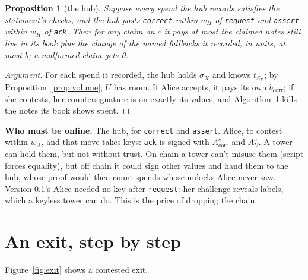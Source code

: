 \documentclass[11pt]{article}
\theoremstyle{plain}
\newtheorem{proposition}{Proposition}
\theoremstyle{definition}
\newcommand{\bcorr}{b_{\mathrm{corr}}}
\newcommand{\tx}[1]{\texttt{#1}}
\newcommand{\Acorr}{A_{\mathrm{corr}}^{c}}
\newcommand{\AU}{A_{U}^{c}}
\begin{document}
\begin{proposition}[the hub]\label{prop:hub}
Suppose every spend the hub records satisfies the statement's checks,
and the hub posts \tx{correct} within $w_H$ of \tx{request} and
\tx{assert} within $w_H$ of \tx{ack}. Then for any claim on $c$ it pays
at most the claimed notes still live in its book plus the change of the
named fallbacks it recorded, in units, at most $b$; a malformed claim
gets 0.
\end{proposition}
\begin{proof}[Argument]
For each spend it recorded, the hub holds $\sigma_X$ and knows $t_{S_X}$;
by Proposition~\ref{prop:volume}, $U$ has room. If Alice accepts, it
pays its own $\bcorr$; if she contests, her countersignature is on
exactly its values, and Algorithm~1 kills the notes its book shows spent.
\end{proof}

\textbf{Who must be online.} The hub, for \tx{correct} and \tx{assert}.
Alice, to contest within $w_A$, and that move takes keys: \tx{ack} is
signed with $\Acorr$ and $\AU$. A tower can hold them, but not without
trust. On chain a tower can't misuse them (script forces equality), but
off chain it could sign other values and hand them to the hub, whose
proof would then count spends whose unlocks Alice never saw. Version
0.1's Alice needed no key after \tx{request}: her challenge reveals
labels, which a keyless tower can do. This is the price of dropping the
chain.

\section{An exit, step by step}

Figure~\ref{fig:exit} shows a contested exit.
\end{document}
